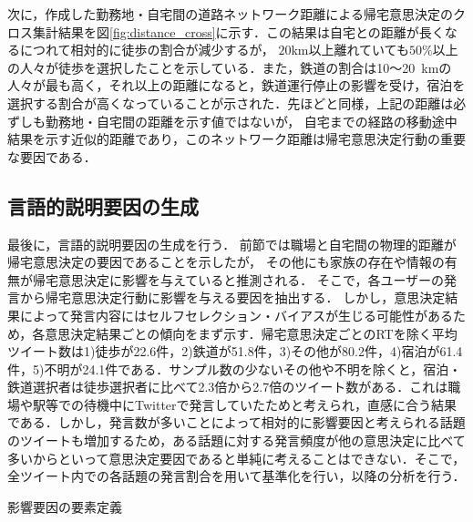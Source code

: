 \documentclass[japanese]{jnlp_1.4}
\begin{document}
次に，作成した勤務地・自宅間の道路ネットワーク距離による帰宅意思決定のクロス集計結果を図\ref{fig:distance_cross}に示す．この結果は自宅との距離が長くなるにつれて相対的に徒歩の割合が減少するが，
$20$km以上離れていても$50\%$以上の人々が徒歩を選択したことを示している．また，鉄道の割合は10〜20~kmの人々が最も高く，それ以上の距離になると，鉄道運行停止の影響を受け，宿泊を選択する割合が高くなっていることが示された．先ほどと同様，上記の距離は必ずしも勤務地・自宅間の距離を示す値ではないが，
自宅までの経路の移動途中結果を示す近似的距離であり，このネットワーク距離は帰宅意思決定行動の重要な要因である．



\subsection{言語的説明要因の生成}

最後に，言語的説明要因の生成を行う．
前節では職場と自宅間の物理的距離が帰宅意思決定の要因であることを示したが，
その他にも家族の存在や情報の有無が帰宅意思決定に影響を与えていると推測される．
そこで，各ユーザーの発言から帰宅意思決定行動に影響を与える要因を抽出する．
しかし，意思決定結果によって発言内容にはセルフセレクション・バイアスが生じる可能性があるため，各意思決定結果ごとの傾向をまず示す．帰宅意思決定ごとのRTを除く平均ツイート数は1)徒歩が22.6件，2)鉄道が51.8件，3)その他が80.2件，4)宿泊が61.4件，5)不明が24.1件である．サンプル数の少ないその他や不明を除くと，宿泊・鉄道選択者は徒歩選択者に比べて2.3倍から2.7倍のツイート数がある．これは職場や駅等での待機中にTwitterで発言していたためと考えられ，直感に合う結果である．しかし，発言数が多いことによって相対的に影響要因と考えられる話題のツイートも増加するため，ある話題に対する発言頻度が他の意思決定に比べて多いからといって意思決定要因であると単純に考えることはできない．そこで，全ツイート内での各話題の発言割合を用いて基準化を行い，以降の分析を行う．

\begin{table}[b]
\caption{影響要因の要素定義}
\label{tab:element_list}

\end{table}
\end{document}
